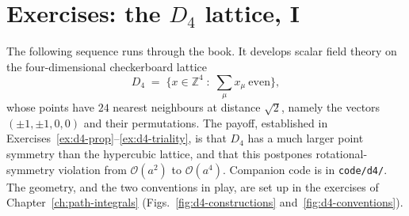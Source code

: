 \section*{Exercises: the \texorpdfstring{$D_4$}{D4} lattice, I}

The following sequence runs through the book. It develops scalar field theory on
the four-dimensional checkerboard lattice
\begin{equation}
  D_4 \;=\; \bigl\{ x \in \mathbb{Z}^4 \;:\; \textstyle\sum_\mu x_\mu \ \text{even} \bigr\},
\end{equation}
whose points have $24$ nearest neighbours at distance $\sqrt{2}$, namely the
vectors $(\pm1,\pm1,0,0)$ and their permutations. The payoff, established in
Exercises~\ref{ex:d4-prop}--\ref{ex:d4-triality}, is that $D_4$ has a much
larger point symmetry than the hypercubic lattice, and that this postpones
rotational-symmetry violation from $\mathcal{O}(a^2)$ to $\mathcal{O}(a^4)$.
Companion code is in \texttt{code/d4/}. The geometry, and the two conventions
in play, are set up in the exercises of Chapter~\ref{ch:path-integrals}
(Figs.~\ref{fig:d4-constructions} and~\ref{fig:d4-conventions}).

